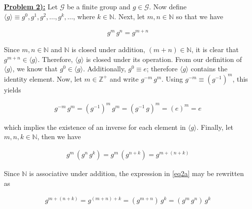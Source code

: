 \documentclass{article}[12]
\numberwithin{equation}{section}
\newcommand{\numbpr}[1]{\setcounter{section}{#1} \setcounter{equation}{0}}
\newcommand{\prob}[1]{\textbf{\underline{Problem #1):}}}
\newcommand{\N}{\mathbb{N}}
\newcommand{\Z}{\mathbb{Z}}
\begin{document}
\begin{flushleft}
\vspace{0.25 in}



\numbpr{2}
\prob{2} Let $\mathcal{G}$ be a finite group and $g \in \mathcal{G}$.  Now define $\langle g \rangle \equiv g^0, g^1, g^2, \dots, g^k, \dots$, where $k \in \N$.  Next, let $m, n \in \N$ so that we have

\begin{align*}
  g^m \, g^n = g^{m + n}
\end{align*}

Since $m, n \in \N$ and $\N$ is closed under addition, $\left( m + n \right) \in \N$, it is clear that $g^{m + n} \in \langle g \rangle$.  Therefore, $\langle g \rangle$ is closed under its operation.  From our definition of $\langle g \rangle$, we know that $g^0 \in \langle g \rangle$.  Additionally, $g^0 \equiv e$; therefore $\langle g \rangle$ contains the identity element.  Now, let $m \in \Z^+$ and write $g^{-m} \, g^m$.  Using $g^{-m} \equiv \left( g^{-1} \right)^m$, this yields

\begin{align*}
  g^{-m} \, g^m = \left( g^{-1} \right)^m \, g^m = \left( g^{-1} \, g \right)^m = \left( e \right)^m = e
\end{align*}

which implies the existence of an inverse for each element in $\langle g \rangle$.  Finally, let $m, n, k \in \N$, then we have

\begin{align}
  g^m \, \left( g^n \, g^k \right) = g^m \, \left( g^{n + k} \right) = g^{m + \left( n + k \right)} \label{eq2a}
\end{align}

Since $\N$ is associative under addition, the expression in \ref{eq2a} may be rewritten as

\begin{align*}
  g^{m + \left( n + k \right)} = g^{\left( m + n \right) + k} = \left( g^{m + n} \right) \, g^k = \left( g^m \, g^n \right) \, g^k
\end{align*}


\end{flushleft}
\end{document}
